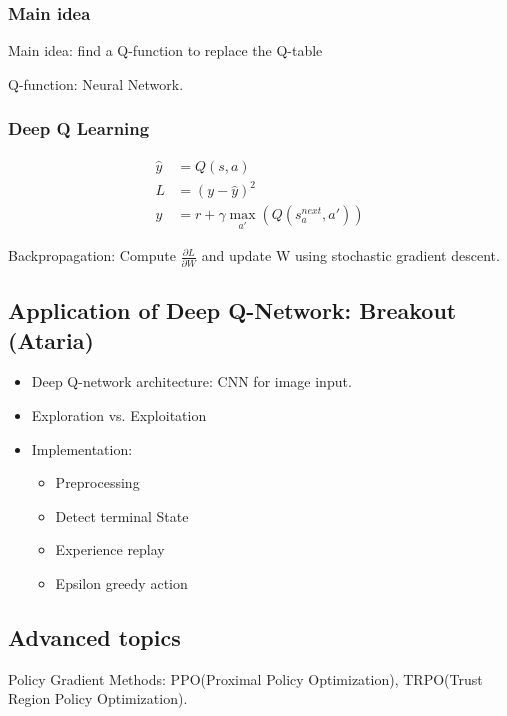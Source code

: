 \subsubsection{Main idea}
Main idea: find a Q-function to replace the Q-table

Q-function: Neural Network.

\subsubsection{Deep Q Learning}
\begin{align}
	\hat{y} &= Q(s, a) \\
	L &= (y - \hat{y})^2 \\
	y &= r + \gamma \displaystyle\max_{a'}(Q(s^{next}_a, a')) %
\end{align}

Backpropagation:
Compute $\frac{\partial L}{\partial W}$ and update W using stochastic gradient descent.


\subsection{Application of Deep Q-Network: Breakout (Ataria)}
\begin{itemize}
	\item Deep Q-network architecture: CNN for image input.
	\item Exploration vs. Exploitation
	\item Implementation:
	\begin{itemize}
		\item Preprocessing
		\item Detect terminal State
		\item Experience replay
		\item Epsilon greedy action
	\end{itemize}
\end{itemize}


\subsection{Advanced topics}
Policy Gradient Methods: 
PPO(Proximal Policy Optimization), 
TRPO(Trust Region Policy Optimization).
